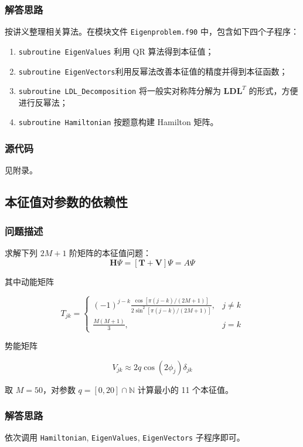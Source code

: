 \documentclass{ctexart}
\begin{document}
\subsubsection{解答思路}
按讲义整理相关算法。在模块文件 \verb|Eigenproblem.f90| 中，包含如下四个子程序：
\begin{enumerate}
    \item \verb|subroutine EigenValues| 利用 QR 算法得到本征值；
    \item \verb|subroutine EigenVectors|利用反幂法改善本征值的精度并得到本征函数；
    \item \verb|subroutine LDL_Decomposition| 将一般实对称阵分解为 $\mathbf{LDL}^T$ 的形式，方便进行反幂法；
    \item \verb|subroutine Hamiltonian| 按题意构建 Hamilton 矩阵。
\end{enumerate}
\subsubsection{源代码}
见附录。
\subsection{本征值对参数的依赖性}
\subsubsection{问题描述}
求解下列 $2M+1$ 阶矩阵的本征值问题：
$$
\mathbf{H} \Psi=[\mathbf{T}+\mathbf{V}] \Psi=A \Psi
$$

其中动能矩阵

$$
T_{j k}=\left\{\begin{array}{ll}{(-1)^{j-k} \frac{\cos [\pi(j-k) /(2 M+1)]}{2 \sin ^{2}[\pi(j-k) /(2 M+1)]},} & {j \neq k} \\ {\frac{M(M+1)}{3},} & {j=k}\end{array}\right.
$$

势能矩阵

$$
V_{j k} \approx 2 q \cos \left(2 \phi_{j}\right) \delta_{j k}
$$

取 $M=50$，对参数 $q=[0,20]\cap\mathbb N$ 计算最小的 11 个本征值。
\subsubsection{解答思路}

依次调用 \verb|Hamiltonian|, \verb|EigenValues|, \verb|EigenVectors| 子程序即可。
\end{document}
